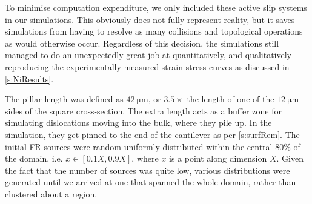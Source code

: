 To minimise computation expenditure, we only included these active slip systems in our simulations. This obviously does not fully represent reality, but it saves simulations from having to resolve as many collisions and topological operations as would otherwise occur. Regardless of this decision, the simulations still managed to do an unexpectedly great job at quantitatively, and qualitatively reproducing the experimentally measured strain-stress curves as discussed in \cref{s:NiResults}.

The pillar length was defined as $\SI{42}{\micro\metre}$, or $3.5\times$ the length of one of the $\SI{12}{\micro\metre}$ sides of the square cross-section. The extra length acts as a buffer zone for simulating dislocations moving into the bulk, where they pile up. In the simulation, they get pinned to the end of the cantilever as per \cref{s:surfRem}. The initial FR sources were random-uniformly distributed within the central $80\%$ of the domain, i.e. $x \in [0.1X, 0.9X]$, where $x$ is a point along dimension $X$. Given the fact that the number of sources was quite low, various distributions were generated until we arrived at one that spanned the whole domain, rather than clustered about a region.

